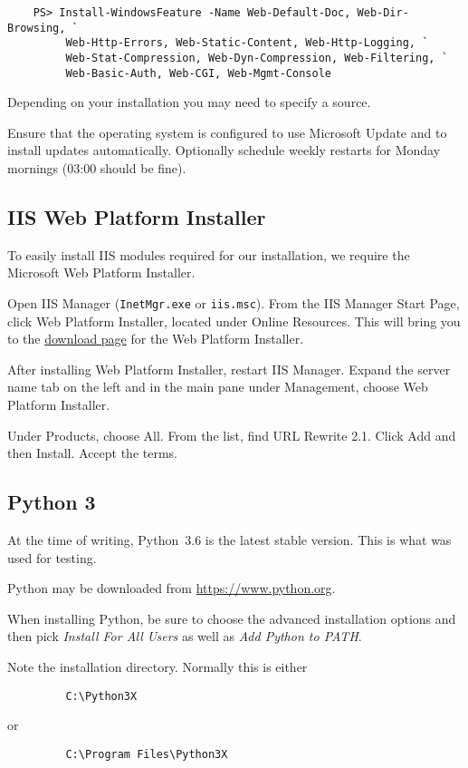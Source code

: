 \documentclass{book}
\renewcommand{\,}{\kern0.2ex}
\begin{document}
	\begin{verbatim}
	PS> Install-WindowsFeature -Name Web-Default-Doc, Web-Dir-Browsing, `
	     Web-Http-Errors, Web-Static-Content, Web-Http-Logging, `
	     Web-Stat-Compression, Web-Dyn-Compression, Web-Filtering, `
	     Web-Basic-Auth, Web-CGI, Web-Mgmt-Console 
	\end{verbatim}
	
	Depending on your installation you may need to specify a source.
	
	Ensure that the operating system is configured to use Microsoft Update and to install updates automatically. Optionally schedule weekly restarts for Monday mornings (03:00 should be fine).
	
	\subsection{IIS Web Platform Installer}
	To easily install IIS modules required for our installation, we require the Microsoft Web Platform Installer. 
	
	Open IIS Manager (\verb|InetMgr.exe| or \verb|iis.msc|). From the IIS Manager Start Page, click Web Platform Installer, located under Online Resources. This will bring you to the \href{https://www.microsoft.com/web/downloads/platform.aspx}{download page} for the Web Platform Installer.
	
	After installing Web Platform Installer, restart IIS Manager. Expand the server name tab on the left and in the main pane under Management, choose Web Platform Installer.
	
	Under Products, choose All. From the list, find URL Rewrite 2.1. Click Add and then Install. Accept the terms.
	
	\subsection{Python 3}
	At the time of writing, Python~3.6 is the latest stable version. This is what was used for testing. 
	
	Python may be downloaded from \url{https://www.python.org}. 
	
	When installing Python, be sure to choose the advanced installation options and then pick {\em Install For All Users} as well as {\em Add Python to PATH}.
	
	Note the installation directory. Normally this is either
	\begin{verbatim}
	     C:\Python3X
	\end{verbatim}
	or 
	\begin{verbatim}
	     C:\Program Files\Python3X
	\end{verbatim}
	
\end{document}
